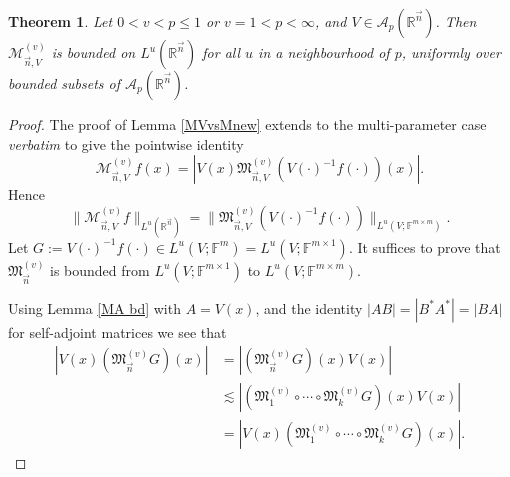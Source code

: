 \documentclass[11pt, reqno]{amsart}
\newtheorem{theorem}{Theorem}[section]
\theoremstyle{definition}
\theoremstyle{remark}
\numberwithin{equation}{section}
\newcommand{\A}{\mathscr A}
\newcommand{\F}{\mathbb F}
\newcommand{\M}{\mathfrak M}
\newcommand{\R}{\mathbb R}
\newcommand{\vn}{\vec n}
\newcommand{\abs}[1]{|#1|}
\newcommand{\Norm}[2]{\|#1\|_{#2}}
\begin{document}
\begin{theorem}\label{newMprod bd}
Let $0<v<p\leq 1$ or $v=1<p<\infty$, and $V\in\A_p(\R^{\vn})$.
Then $\mathcal M^{(v)}_{\vn,V}$ is bounded on $L^u(\R^{\vn})$ for all $u$ in a neighbourhood of $p$, uniformly over bounded subsets of $\A_p(\R^{\vn})$.
\end{theorem}

\begin{proof}
The proof of Lemma \ref{MVvsMnew} extends to the multi-parameter case {\em verbatim} to give the pointwise identity
\begin{equation*}
\mathcal M^{(v)}_{\vn,V}f(x)
=\abs{V(x)\M^{(v)}_{\vn,V}(V(\cdot)^{-1}f(\cdot))(x)}.
\end{equation*}
Hence
\begin{equation*}
\Norm{\mathcal M^{(v)}_{\vn,V}f}{L^u(\R^{\vn})}
=\Norm{\M^{(v)}_{\vn,V}(V(\cdot)^{-1}f(\cdot))}{L^u(V;\F^{m\times m})}.
\end{equation*}
Let $G:=V(\cdot)^{-1}f(\cdot)\in L^u(V;\F^m)=L^u(V;\F^{m\times 1})$. It suffices to prove that $\M^{(v)}_{\vn}$ is bounded from $L^u(V;\F^{m\times 1})$ to $L^u(V;\F^{m\times m})$.

Using Lemma \ref{MA bd} with $A=V(x)$, and the identity $\abs{AB}=\abs{B^*A^*}=\abs{BA}$ for self-adjoint matrices we see that
\begin{align*}
\abs{V(x)(\M^{(v)}_{\vn}G)(x)}
&=\abs{(\M^{(v)}_{\vn}G)(x)V(x)} \\
&\lesssim\abs{(\M^{(v)}_{1}\circ\cdots\circ\M^{(v)}_k G)(x)V(x)} \\
&=\abs{V(x)(\M^{(v)}_{1}\circ\cdots\circ\M^{(v)}_k G)(x)}.
\end{align*}


\end{proof}
\end{document}
